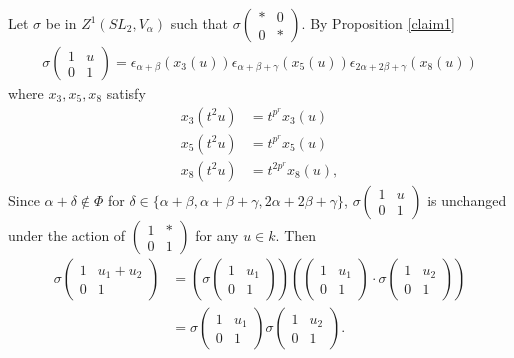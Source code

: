 	Let $\sigma$ be in $Z^1(SL_2, V_\alpha)$ such that $\sigma\left(\begin{matrix}* & 0\\0 & *\end{matrix}\right)$. By Proposition \ref{claim1}
	\begin{align*}
	\sigma\left(\begin{matrix}1 & u\\0 & 1\end{matrix}\right) = 
\epsilon_{\alpha+\beta}\left(x_3(u)\right)
\epsilon_{\alpha+\beta+\gamma}\left(x_5(u)\right)
\epsilon_{2\alpha+2\beta+\gamma}\left(x_8(u)\right)
	\end{align*}
	where $x_3, x_5, x_8$ satisfy
	\begin{align}
	x_3(t^2u) &= t^{p^r}x_3(u)\label{c3x3} \\
	x_5(t^2u) &= t^{p^r}x_5(u)\label{c3x5} \\
	x_8(t^2u) &= t^{2p^r}x_8(u),\label{c3x8}
	\end{align}
	Since $\alpha + \delta \notin \Phi$ for $\delta \in \{\alpha + \beta, \alpha + \beta + \gamma, 2\alpha + 2\beta + \gamma\}$, $\sigma\left(\begin{matrix}1 & u\\0 & 1\end{matrix}\right)$ is unchanged under the action of $\left(\begin{matrix}1 & *\\0 & 1\end{matrix}\right)$ for any $u\in k$. Then
\begin{align*}
	\sigma\left(\begin{matrix} 1 & u_1 + u_2 \\0 & 1\end{matrix}\right) &= 
	\left(\sigma\left(\begin{matrix} 1 & u_1\\0 & 1\end{matrix}\right)\right)
	\left(\left(\begin{matrix} 1 & u_1\\0 & 1\end{matrix}\right)\cdot
	\sigma\left(\begin{matrix} 1 & u_2\\0 & 1\end{matrix}\right)\right) \\ &=
	\sigma\left(\begin{matrix} 1 & u_1\\0 & 1\end{matrix}\right)
	\sigma\left(\begin{matrix} 1 & u_2 \\0 & 1\end{matrix}\right).
\end{align*}
